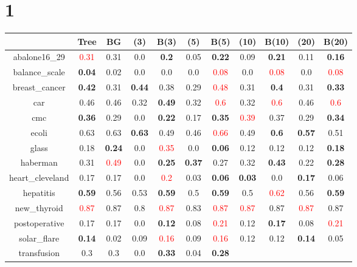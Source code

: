 \documentclass{article}%
\begin{document}
\section*{1}%
\begin{tabular}{c|cccccccccc}%
\hline%
&Tree&BG&(3)&B(3)&(5)&B(5)&(10)&B(10)&(20)&B(20)\\%
\hline%
abalone16\_29&\textcolor{red}{ 
0.31
}&0.31&0.0&\textbf{0.2}&0.05&\textbf{0.22}&0.09&\textbf{0.21}&0.11&\textbf{0.16}\\%
\hline%
balance\_scale&\textbf{0.04}&0.02&0.0&0.0&0.0&\textcolor{red}{ 
0.08
}&0.0&\textcolor{red}{ 
0.08
}&0.0&\textcolor{red}{ 
0.08
}\\%
\hline%
breast\_cancer&\textbf{0.42}&0.31&\textbf{0.44}&0.38&0.29&\textcolor{red}{ 
0.48
}&0.31&\textbf{0.4}&0.31&\textbf{0.33}\\%
\hline%
car&0.46&0.46&0.32&\textbf{0.49}&0.32&\textcolor{red}{ 
0.6
}&0.32&\textcolor{red}{ 
0.6
}&0.46&\textcolor{red}{ 
0.6
}\\%
\hline%
cmc&\textbf{0.36}&0.29&0.0&\textbf{0.22}&0.17&\textbf{0.35}&\textcolor{red}{ 
0.39
}&0.37&0.29&\textbf{0.34}\\%
\hline%
ecoli&0.63&0.63&\textbf{0.63}&0.49&0.46&\textcolor{red}{ 
0.66
}&0.49&\textbf{0.6}&\textbf{0.57}&0.51\\%
\hline%
glass&0.18&\textbf{0.24}&0.0&\textcolor{red}{ 
0.35
}&0.0&\textbf{0.06}&0.12&0.12&0.12&\textbf{0.18}\\%
\hline%
haberman&0.31&\textcolor{red}{ 
0.49
}&0.0&\textbf{0.25}&\textbf{0.37}&0.27&0.32&\textbf{0.43}&0.22&\textbf{0.28}\\%
\hline%
heart\_cleveland&0.17&0.17&0.0&\textcolor{red}{ 
0.2
}&0.03&\textbf{0.06}&\textbf{0.03}&0.0&\textbf{0.17}&0.06\\%
\hline%
hepatitis&\textbf{0.59}&0.56&0.53&\textbf{0.59}&0.5&\textbf{0.59}&0.5&\textcolor{red}{ 
0.62
}&0.56&\textbf{0.59}\\%
\hline%
new\_thyroid&\textcolor{red}{ 
0.87
}&0.87&0.8&\textcolor{red}{ 
0.87
}&0.83&\textcolor{red}{ 
0.87
}&\textcolor{red}{ 
0.87
}&0.87&\textcolor{red}{ 
0.87
}&0.87\\%
\hline%
postoperative&0.17&0.17&0.0&\textbf{0.12}&0.08&\textcolor{red}{ 
0.21
}&0.12&\textbf{0.17}&0.08&\textcolor{red}{ 
0.21
}\\%
\hline%
solar\_flare&\textbf{0.14}&0.02&0.09&\textcolor{red}{ 
0.16
}&0.09&\textcolor{red}{ 
0.16
}&0.12&0.12&\textbf{0.14}&0.05\\%
\hline%
transfusion&0.3&0.3&0.0&\textbf{0.33}&0.04&\textbf{0.28}&\textcolor{red}{ 
}
\end{tabular}
\end{document}

